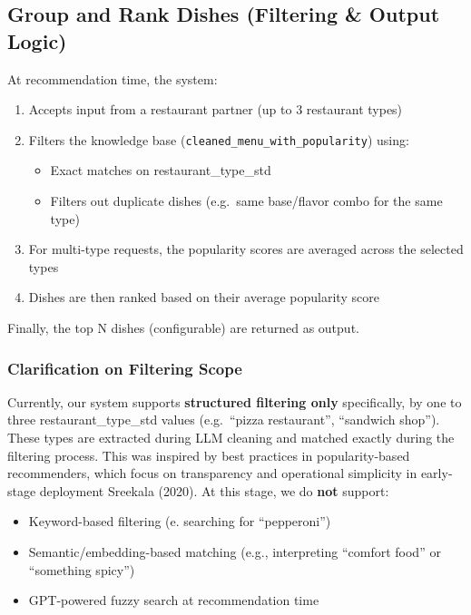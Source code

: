 \documentclass[
  11pt,
  a4paper,
  DIV=11,
  numbers=noendperiod]{scrartcl}
\providecommand{\tightlist}{%
  \setlength{\itemsep}{0pt}\setlength{\parskip}{0pt}}\usepackage{longtable,booktabs,array}
\begin{document}
\subsection{Group and Rank Dishes (Filtering \& Output
Logic)}\label{group-and-rank-dishes-filtering-output-logic}

At recommendation time, the system:

\begin{enumerate}
\def\labelenumi{\arabic{enumi}.}
\tightlist
\item
  Accepts input from a restaurant partner (up to 3 restaurant types)
\item
  Filters the knowledge base (\texttt{cleaned\_menu\_with\_popularity})
  using:

  \begin{itemize}
  \tightlist
  \item
    Exact matches on restaurant\_type\_std
  \item
    Filters out duplicate dishes (e.g.~same base/flavor combo for the
    same type)
  \end{itemize}
\item
  For multi-type requests, the popularity scores are averaged across the
  selected types
\item
  Dishes are then ranked based on their average popularity score
\end{enumerate}

Finally, the top N dishes (configurable) are returned as output.

\subsubsection{Clarification on Filtering
Scope}\label{clarification-on-filtering-scope}

Currently, our system supports \textbf{structured filtering only}
specifically, by one to three restaurant\_type\_std values (e.g.~``pizza
restaurant'', ``sandwich shop''). These types are extracted during LLM
cleaning and matched exactly during the filtering process. This was
inspired by best practices in popularity-based recommenders, which focus
on transparency and operational simplicity in early-stage deployment
Sreekala (2020). At this stage, we do \textbf{not} support:

\begin{itemize}
\tightlist
\item
  Keyword-based filtering (e. searching for ``pepperoni'')
\item
  Semantic/embedding-based matching (e.g., interpreting ``comfort food''
  or ``something spicy'')
\item
  GPT-powered fuzzy search at recommendation time
\end{itemize}
\end{document}
